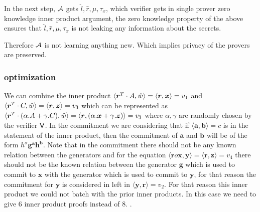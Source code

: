 In the next step, ${\cal A}$ gets $\hat{l}, \hat{r}, \mu, \tau_x$, which verifier gets in single prover zero knowledge inner product argument, the zero knowledge property of the above ensures that $\hat{l}, \hat{r}, \mu, \tau_x$ is not leaking any information about the secrets.

Therefore ${\cal A}$ is not learning anything new. Which implies privacy of the provers are preserved.

\subsubsection{optimization}
We can combine the inner product $\langle \bm{r}^T \cdot A, \hat{w} \rangle = \langle \bm{r}, \bm{x} \rangle = v_1$ and $\langle \bm{r}^T \cdot C, \hat{w} \rangle = \langle \bm{r}, \bm{z} \rangle = v_3$ which can be represented as $\langle \bm{r}^T \cdot(\alpha.A+\gamma.C), \hat{w} \rangle = \langle \bm{r}, (\alpha.\bm{x}+\gamma.\bm{z}) \rangle = v_3$ where $\alpha, \gamma$ are randomly chosen by the verifier $\mathsf{V}$. In the commitment we are considering that if $\langle \bm{a},\bm{b}\rangle= c$ is in the statement of the inner product, then the commitment of $\bm{a}$ and $\bm{b}$ will be of the form $h^{\sigma} \bm{g}^{\bm{a}} \bm{h}^{\bm{b}}$. Note that in the commitment there should not be any known relation between the generators and for the equation $\langle \bm{r} o \bm{x}, \bm{y} \rangle = \langle \bm{r}, \bm{z} \rangle = v_4$ there should not be the known relation between the generator $\bm{g}$ which is used to commit to $\bm{x}$ with the generator which is used to commit to $\bm{y}$, for that reason the commitment for $\bm{y}$ is considered in left in $\langle \bm{y}, \bm{r} \rangle = v_2$. For that reason this inner product we could not batch with the prior inner products. In this case we need to give 6 inner product proofs instead of 8. 
.
